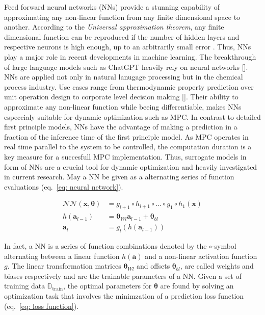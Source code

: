 Feed forward neural networks (NNs) provide a stunning capability of approximating any non-linear function from any finite dimensional
space to another. According to the \emph{Universal approximation theorem}, any finite dimensional function can be reproduced if the number of hidden
layers and respective neurons is high enough, up to an arbitrarily small error \cite{hornik1990}. Thus, NNs play a major role in
recent developments in machine learning. The breakthrough of large language models such as ChatGPT heavily rely on neural
networks [\cite{vaswani2023}]. NNs are applied not only in natural lanugage processing but in the chemical process industry.
Use cases range from thermodynamic property prediction over unit operation design to corporate level decision making [\cite{mcbride2019}].
Their ability to approximate any non-linear function while beeing differentiable, makes NNs especcialy suitable for dynamic optimization
such as MPC. In contrast to detailed first principle models, NNs have the advantage of making a prediction in a fraction of the inference time
of the first principle model. As MPC operates in real time parallel to the system to be controlled, the computation duration is a key measure
for a succesfull MPC implementation. Thus, surrogate models in form of NNs are a crucial tool for dynamic optimization and heavily investigated
in current research. May a NN be given as a alternating series of function evaluations (eq.~\ref{eq: neural network}).

\begin{equation}
    \label{eq: neural network}
    \begin{aligned}
        \mathcal{NN}(\bm{x, \bm{\theta}}) &= g_{l+1} \circ h_{l+1} \circ ... \circ g_1 \circ h_1(\bm{x})
        \\
        h(\bm{a}_{l-1}) &= \bm{\theta}_{Wl}\bm{a}_{l-1} + \bm{\theta}_{bl}
        \\
        \bm{a}_{l} &= g_l(h(\bm{a}_{l-1}))
    \end{aligned}
\end{equation}

In fact, a NN is a series of function combinations denoted by the $\circ$-symbol alternating between a linear function $h(\bm{a})$
and a non-linear activation function $g$. The linear transformation matrices $\bm{\theta}_{Wl}$ and offsets $\bm{\theta}_{bl}$,
are called weights and biases respectively and are the trainable parameters of a NN. Given a set of training data $\mathbb{D}_\text{train}$,
the optimal parameters for $\bm{\theta}$ are found by solving an optimization task that involves the minimzation of a prediction loss function (eq.~\ref{eq: loss function}).

